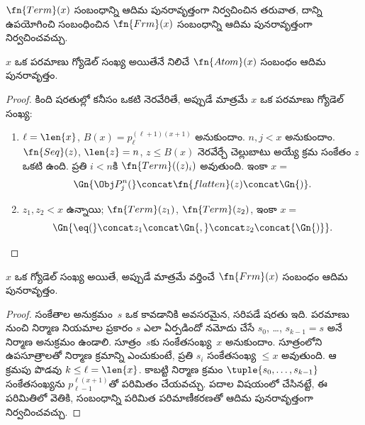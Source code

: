 \documentclass[../../../include/open-logic-section]{subfiles}
\begin{document}

$\fn{Term}(x)$ సంబంధాన్ని ఆదిమ పునరావృత్తంగా నిర్వచించిన తరువాత, దాన్ని
ఉపయోగించి  సంబంధించిన $\fn{Frm}(x)$
సంబంధాన్ని ఆదిమ పునరావృత్తంగా నిర్వచించవచ్చు.

\begin{prop}
$x$ ఒక పరమాణు  గ్యోడెల్ సంఖ్య అయితేనే
నిలిచే $\fn{Atom}(x)$ సంబంధం ఆదిమ పునరావృత్తం.
\end{prop}

\begin{proof}
కింది షరతుల్లో కనీసం ఒకటి నెరవేరితే, అప్పుడే మాత్రమే $x$ ఒక పరమాణు
 గ్యోడెల్ సంఖ్య:
\begin{enumerate}
\item $\ell=\len{x}$, $B(x)=p_\ell^{(\ell+1)(x+1)}$ అనుకుందాం.
  $n,j<x$ అనుకుందాం. $\fn{Seq}(z)$,
  $\len{z}=n$, $z\leq B(x)$ నెరవేర్చే చెల్లుబాటు అయ్యే క్రమ సంకేతం $z$ ఒకటి ఉంది. ప్రతి $i<n$కి
  $\fn{Term}((z)_i)$ అవుతుంది. ఇంకా $x=$
\[
\Gn{\Obj P^n_j(} \concat \fn{flatten}(z) \concat \Gn{)}.
\]
\item $z_1,z_2<x$ ఉన్నాయి; $\fn{Term}(z_1)$, $\fn{Term}(z_2)$, ఇంకా
  $x=$
\[
\Gn{{\eq}(} \concat z_1 \concat \Gn{,} \concat z_2 \concat{\Gn{)}}.
\]
\end{enumerate}
\end{proof}

\begin{prop}
$x$ ఒక  గ్యోడెల్ సంఖ్య అయితే, అప్పుడే మాత్రమే వర్తించే
$\fn{Frm}(x)$ సంబంధం ఆదిమ పునరావృత్తం.
\end{prop}

\begin{proof}
సంకేతాల అనుక్రమం~$s$ ఒక  కావడానికి అవసరమైన,
సరిపడే షరతు ఇది. పరమాణు  నుంచి నిర్మాణ
నియమాల ప్రకారం $s$ ఎలా ఏర్పడిందో నమోదు చేసే $s_0$, \dots,
$s_{k-1}=s$ అనే  నిర్మాణ అనుక్రమం ఉండాలి.
సూత్రం~$s$కు సంకేతసంఖ్య~$x$ అనుకుందాం. సూత్రంలోని ఉపసూత్రాలతో నిర్మాణ
క్రమాన్ని ఎంచుకుంటే, ప్రతి $s_i$ సంకేతసంఖ్య $\leq x$ అవుతుంది. ఆ క్రమపు
పొడవు $k\leq\ell=\len{x}$. కాబట్టి నిర్మాణ క్రమం
$\tuple{s_0,\dots,s_{k-1}}$ సంకేతసంఖ్యను $p_{\ell-1}^{\ell(x+1)}$తో
పరిమితం చేయవచ్చు. పదాల విషయంలో చేసినట్టే, ఈ పరిమితిలో వెతికి, సంబంధాన్ని
పరిమిత పరిమాణీకరణతో ఆదిమ పునరావృత్తంగా నిర్వచించవచ్చు.
\end{proof}
\end{document}
